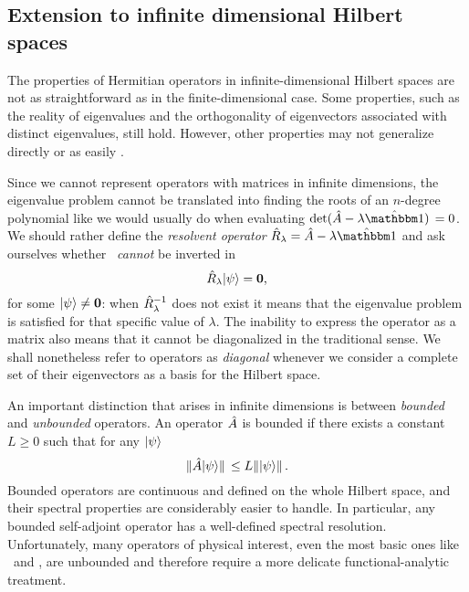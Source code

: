         \subsection{Extension to infinite dimensional Hilbert spaces}
            The properties of Hermitian operators in infinite-dimensional Hilbert spaces are not as straightforward as in the finite-dimensional case. Some properties, such as the reality of eigenvalues and the orthogonality of eigenvectors associated with distinct eigenvalues, still hold. However, other properties may not generalize directly or as easily \cite{Bernardini1993-iy}.

            Since we cannot represent operators with matrices in infinite dimensions, the eigenvalue problem cannot be translated into finding the roots of an $n$-degree polynomial like we would usually do when evaluating $\det\!\pqty*{\hA - \lambda\hidM} = 0$. We should rather define the \emph{resolvent operator} $\hRl = \hA - \lambda\hidM$ and ask ourselves whether \hRl\ \emph{cannot} be inverted in
            \begin{equation}
                \label{eq:eigenvalue-problem-infinite}
                \hat{R}_\lambda\! \ket{\psi} = \vb{0}
                \text{,}
            \end{equation}
            for some $\ket{\psi} \neq \vb{0}$: when $\hat{R}_\lambda^{-1}$ does not exist it means that the eigenvalue problem is satisfied for that specific value of $\lambda$. The inability to express the operator as a matrix also means that it cannot be diagonalized in the traditional sense. We shall nonetheless refer to operators as \emph{diagonal} whenever we consider a complete set of their eigenvectors as a basis for the Hilbert space.

            An important distinction that arises in infinite dimensions is between \emph{bounded} and \emph{unbounded} operators. An operator $\hat{A}$ is bounded if there exists a constant $L \geq 0$ such that for any $\ket{\psi}$
            \begin{equation*}  
                \norm*{\hat{A}\! \ket{\psi}} \leq L \norm*{\ket{\psi}}
                \text{.}
            \end{equation*}
            Bounded operators are continuous and defined on the whole Hilbert space, and their spectral properties are considerably easier to handle. In particular, any bounded self-adjoint operator has a well-defined spectral resolution. Unfortunately, many operators of physical interest, even the most basic ones like \hx\ and \hp, are unbounded and therefore require a more delicate functional-analytic treatment.


